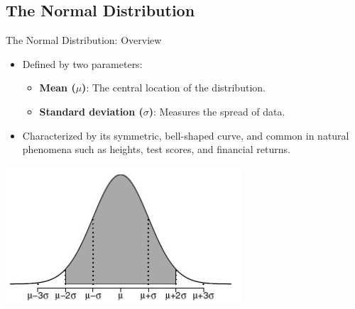 \documentclass[aspectratio=169,xcolor=dvipsnames]{beamer}
\begin{document}
\subsection{The Normal Distribution}
\begin{frame}{The Normal Distribution: Overview}
\begin{itemize}
    \setlength\itemsep{0.5cm}
    \item Defined by two parameters:
    \begin{itemize}
        \item \textbf{Mean ($\mu$)}: The central location of the distribution.
        \item \textbf{Standard deviation ($\sigma$)}: Measures the spread of data.
    \end{itemize}
    \item Characterized by its symmetric, bell-shaped curve, and common in natural phenomena such as heights, test scores, and financial returns.
\end{itemize}
\centering
\includegraphics[scale=0.4]{images/normal_dist.png}
\end{frame}
\end{document}
